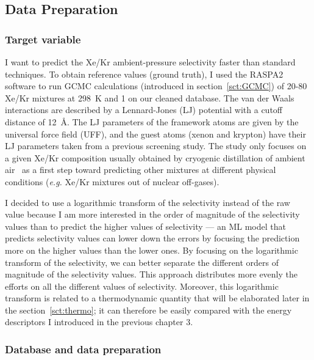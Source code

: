 \documentclass[main]{subfiles}
\begin{document}
\subsection{Data Preparation}


\subsubsection{Target variable}

I want to predict the Xe/Kr ambient-pressure selectivity faster than standard techniques. To obtain reference values (ground truth), I used the RASPA2 software\autocite{dubbeldam2016} to run GCMC calculations (introduced in section~\ref{sct:GCMC}) of 20-80 Xe/Kr mixtures at \SI{298}{\kelvin} and \SI{1}{\atm} on our cleaned database. The van der Waals interactions are described by a Lennard-Jones (LJ) potential with a cutoff distance of \SI{12}{\angstrom}. The LJ parameters of the framework atoms are given by the universal force field (UFF),\autocite{rappe1992} and the guest atoms (xenon and krypton) have their LJ parameters taken from a previous screening study.\autocite{Ryan_2010} The study only focuses on a given Xe/Kr composition usually obtained by cryogenic distillation of ambient air~\autocite{kerry2007industrial} as a first step toward predicting other mixtures at different physical conditions (\emph{e.g.} Xe/Kr mixtures out of nuclear off-gases). 

I decided to use a logarithmic transform of the selectivity instead of the raw value because I am more interested in the order of magnitude of the selectivity values than to predict the higher values of selectivity --- an ML model that predicts selectivity values can lower down the errors by focusing the prediction more on the higher values than the lower ones. By focusing on the logarithmic transform of the selectivity, we can better separate the different orders of magnitude of the selectivity values. This approach distributes more evenly the efforts on all the different values of selectivity. Moreover, this logarithmic transform is related to a thermodynamic quantity that will be elaborated later in the section~\ref{sct:thermo}; it can therefore be easily compared with the energy descriptors I introduced in the previous chapter 3.

\subsubsection{Database and data preparation}
\end{document}
